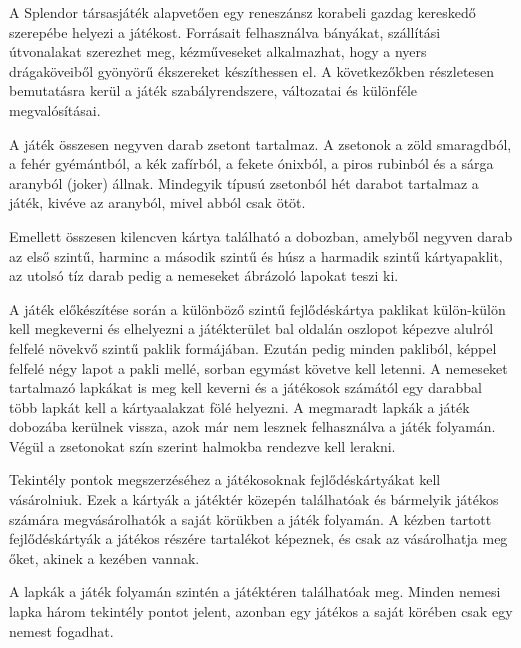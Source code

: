 
A Splendor társasjáték alapvetően egy reneszánsz korabeli gazdag kereskedő szerepébe helyezi a játékost.
Forrásait felhasználva bányákat, szállítási útvonalakat szerezhet meg, kézműveseket
alkalmazhat, hogy a nyers drágaköveiből gyönyörű ékszereket készíthessen el.
A következőkben részletesen bemutatásra kerül a játék szabályrendszere, változatai és különféle megvalósításai.


A játék összesen negyven darab zsetont tartalmaz. A zsetonok a zöld smaragdból, a fehér gyémántból, a kék zafírból, a fekete ónixból, a piros rubinból és a sárga aranyból (joker) állnak. Mindegyik típusú zsetonból hét darabot tartalmaz a játék, kivéve az aranyból, mivel abból csak ötöt.

Emellett összesen kilencven kártya található a dobozban, amelyből negyven darab az első szintű, harminc a második szintű és húsz a harmadik szintű kártyapaklit, az utolsó tíz darab pedig a nemeseket ábrázoló lapokat teszi ki.

A játék előkészítése során a különböző szintű fejlődéskártya paklikat külön-külön kell megkeverni és elhelyezni a játékterület bal oldalán oszlopot képezve alulról felfelé növekvő szintű paklik formájában.
Ezután pedig minden pakliból, képpel felfelé négy lapot a pakli mellé, sorban
egymást követve kell letenni.
A nemeseket tartalmazó lapkákat is meg kell keverni és a játékosok számától egy darabbal több lapkát kell a kártyaalakzat fölé helyezni. A megmaradt lapkák a játék dobozába kerülnek vissza, azok már nem lesznek
felhasználva a játék folyamán. Végül a zsetonokat szín szerint halmokba rendezve kell lerakni.


Tekintély pontok megszerzéséhez a játékosoknak fejlődéskártyákat kell vásárolniuk. Ezek a kártyák a játéktér közepén találhatóak és bármelyik játékos számára megvásárolhatók a saját körükben a játék folyamán. A kézben tartott fejlődéskártyák a játékos részére tartalékot képeznek, és csak az vásárolhatja meg őket, akinek a kezében vannak.


A lapkák a játék folyamán szintén a játéktéren találhatóak meg. Minden nemesi lapka három tekintély pontot jelent, azonban egy játékos a saját körében csak egy nemest fogadhat.


